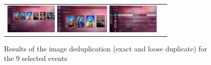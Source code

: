 \documentclass{acm_proc_article-sp}
\newcommand{\thumbheight}{14mm}
\newcommand{\newstrip}{\newline\vspace{-1em}\newline}
\newenvironment{thumbsequence}{}{\makebox[4mm]{}}
\begin{document}
\begin{figure}
\begin{tabular}{p{}p{}}
\begin{thumbsequence}
		\newstrip
		\includegraphics[height=\thumbheight]{resources/ubuntu/looseduplicate3.jpg}
		\includegraphics[height=\thumbheight]{resources/ubuntu/looseduplicate4.jpg}
		\newstrip
		\includegraphics[height=\thumbheight]{resources/ubuntu/looseduplicate5.png}
	\end{thumbsequence}
\end{tabular}
\caption{Results of the image deduplication (exact and loose duplicate) for the 9 selected events}
\label{fig:sequences}
\end{figure}

\end{document}

